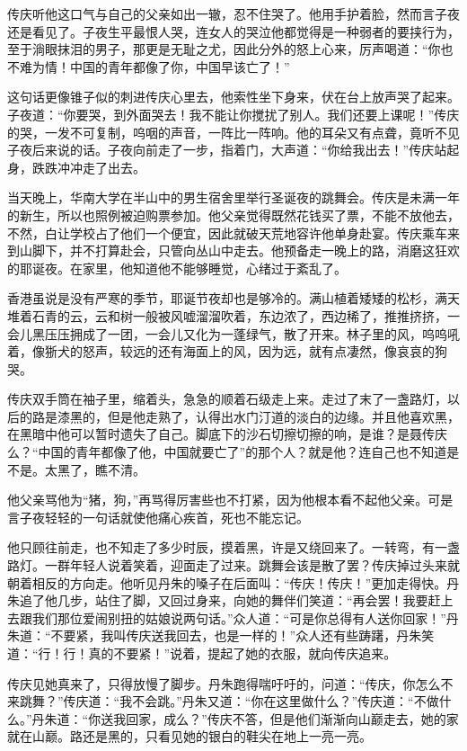 \par 传庆听他这口气与自己的父亲如出一辙，忍不住哭了。他用手护着脸，然而言子夜还是看见了。子夜生平最恨人哭，连女人的哭泣他都觉得是一种弱者的要挟行为，至于淌眼抹泪的男子，那更是无耻之尤，因此分外的怒上心来，厉声喝道：“你也不难为情！中国的青年都像了你，中国早该亡了！”
\par 这句话更像锥子似的刺进传庆心里去，他索性坐下身来，伏在台上放声哭了起来。子夜道：“你要哭，到外面哭去！我不能让你搅扰了别人。我们还要上课呢！”传庆的哭，一发不可复制，呜咽的声音，一阵比一阵响。他的耳朵又有点聋，竟听不见子夜后来说的话。子夜向前走了一步，指着门，大声道：“你给我出去！”传庆站起身，跌跌冲冲走了出去。
\par 当天晚上，华南大学在半山中的男生宿舍里举行圣诞夜的跳舞会。传庆是未满一年的新生，所以也照例被迫购票参加。他父亲觉得既然花钱买了票，不能不放他去，不然，白让学校占了他们一个便宜，因此就破天荒地容许他单身赴宴。传庆乘车来到山脚下，并不打算赴会，只管向丛山中走去。他预备走一晚上的路，消磨这狂欢的耶诞夜。在家里，他知道他不能够睡觉，心绪过于紊乱了。
\par 香港虽说是没有严寒的季节，耶诞节夜却也是够冷的。满山植着矮矮的松杉，满天堆着石青的云，云和树一般被风嘘溜溜吹着，东边浓了，西边稀了，推推挤挤，一会儿黑压压拥成了一团，一会儿又化为一蓬绿气，散了开来。林子里的风，呜呜吼着，像狾犬的怒声，较远的还有海面上的风，因为远，就有点凄然，像哀哀的狗哭。
\par 传庆双手筒在袖子里，缩着头，急急的顺着石级走上来。走过了末了一盏路灯，以后的路是漆黑的，但是他走熟了，认得出水门汀道的淡白的边缘。并且他喜欢黑，在黑暗中他可以暂时遗失了自己。脚底下的沙石切擦切擦的响，是谁？是聂传庆么？“中国的青年都像了他，中国就要亡了”的那个人？就是他？连自己也不知道是不是。太黑了，瞧不清。
\par 他父亲骂他为“猪，狗，”再骂得厉害些也不打紧，因为他根本看不起他父亲。可是言子夜轻轻的一句话就使他痛心疾首，死也不能忘记。
\par 他只顾往前走，也不知走了多少时辰，摸着黑，许是又绕回来了。一转弯，有一盏路灯。一群年轻人说着笑着，迎面走了过来。跳舞会该是散了罢？传庆掉过头来就朝着相反的方向走。他听见丹朱的嗓子在后面叫：“传庆！传庆！”更加走得快。丹朱追了他几步，站住了脚，又回过身来，向她的舞伴们笑道：“再会罢！我要赶上去跟我们那位爱闹别扭的姑娘说两句话。”众人道：“可是你总得有人送你回家！”丹朱道：“不要紧，我叫传庆送我回去，也是一样的！”众人还有些踌躇，丹朱笑道：“行！行！真的不要紧！”说着，提起了她的衣服，就向传庆追来。
\par 传庆见她真来了，只得放慢了脚步。丹朱跑得喘吁吁的，问道：“传庆，你怎么不来跳舞？”传庆道：“我不会跳。”丹朱又道：“你在这里做什么？”传庆道：“不做什么。”丹朱道：“你送我回家，成么？”传庆不答，但是他们渐渐向山巅走去，她的家就在山巅。路还是黑的，只看见她的银白的鞋尖在地上一亮一亮。
